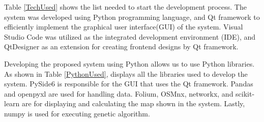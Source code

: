 	Table \ref{TechUsed} shows the list needed to start the development process. The system was developed using Python programming language, and Qt framework to efficiently implement the graphical user interface(GUI) of the system. Visual Studio Code was utilized as the integrated development environment (IDE), and QtDesigner as an extension for creating frontend designs by Qt framework.
	
	\begin{table}[h]
		\centering
		\caption{List of tools and technologies used in the development process}
		\label{TechUsed}
	\end{table}
	
	Developing the proposed system using Python allows us to use Python libraries. As shown in Table \ref{PythonUsed}, displays all the libraries used to develop the system. PySide6 is responsible for the GUI that uses the Qt framework. Pandas and openpyxl are used for handling data. Folium, OSMnx, networkx, and scikit-learn are for displaying and calculating the map shown in the system. Lastly, numpy is used for executing genetic algorithm.
	
